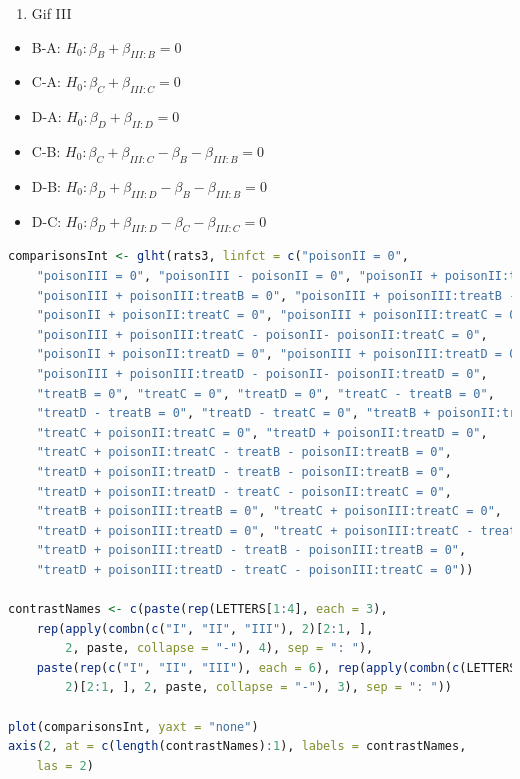 \documentclass[
  12pt,dutch,coursenotes]{book}
\providecommand{\tightlist}{%
  \setlength{\itemsep}{0pt}\setlength{\parskip}{0pt}}
\begin{document}
\begin{enumerate}
\def\labelenumi{\arabic{enumi}.}
\setcounter{enumi}{2}
\tightlist
\item
  Gif III
\end{enumerate}

\begin{itemize}
\tightlist
\item
  B-A: \(H_0: \beta_{B}+\beta_{III:B}=0\)
\item
  C-A: \(H_0: \beta_{C}+\beta_{III:C}=0\)
\item
  D-A: \(H_0: \beta_{D}+\beta_{II:D}=0\)
\item
  C-B: \(H_0: \beta_{C}+\beta_{III:C}-\beta_{B}-\beta_{III:B}=0\)
\item
  D-B: \(H_0: \beta_{D}+\beta_{III:D}-\beta_{B}-\beta_{III:B}=0\)
\item
  D-C: \(H_0: \beta_{D}+\beta_{III:D}-\beta_{C}-\beta_{III:C}=0\)
\end{itemize}

\begin{lstlisting}[language=R]
comparisonsInt <- glht(rats3, linfct = c("poisonII = 0",
    "poisonIII = 0", "poisonIII - poisonII = 0", "poisonII + poisonII:treatB = 0",
    "poisonIII + poisonIII:treatB = 0", "poisonIII + poisonIII:treatB - poisonII- poisonII:treatB = 0",
    "poisonII + poisonII:treatC = 0", "poisonIII + poisonIII:treatC = 0",
    "poisonIII + poisonIII:treatC - poisonII- poisonII:treatC = 0",
    "poisonII + poisonII:treatD = 0", "poisonIII + poisonIII:treatD = 0",
    "poisonIII + poisonIII:treatD - poisonII- poisonII:treatD = 0",
    "treatB = 0", "treatC = 0", "treatD = 0", "treatC - treatB = 0",
    "treatD - treatB = 0", "treatD - treatC = 0", "treatB + poisonII:treatB = 0",
    "treatC + poisonII:treatC = 0", "treatD + poisonII:treatD = 0",
    "treatC + poisonII:treatC - treatB - poisonII:treatB = 0",
    "treatD + poisonII:treatD - treatB - poisonII:treatB = 0",
    "treatD + poisonII:treatD - treatC - poisonII:treatC = 0",
    "treatB + poisonIII:treatB = 0", "treatC + poisonIII:treatC = 0",
    "treatD + poisonIII:treatD = 0", "treatC + poisonIII:treatC - treatB - poisonIII:treatB = 0",
    "treatD + poisonIII:treatD - treatB - poisonIII:treatB = 0",
    "treatD + poisonIII:treatD - treatC - poisonIII:treatC = 0"))

contrastNames <- c(paste(rep(LETTERS[1:4], each = 3),
    rep(apply(combn(c("I", "II", "III"), 2)[2:1, ],
        2, paste, collapse = "-"), 4), sep = ": "),
    paste(rep(c("I", "II", "III"), each = 6), rep(apply(combn(c(LETTERS[1:4]),
        2)[2:1, ], 2, paste, collapse = "-"), 3), sep = ": "))

plot(comparisonsInt, yaxt = "none")
axis(2, at = c(length(contrastNames):1), labels = contrastNames,
    las = 2)
\end{lstlisting}
\end{document}
